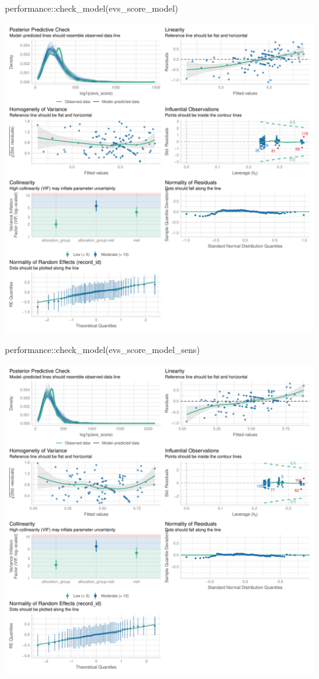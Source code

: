 \documentclass[
  12pt,
]{article}
\newenvironment{Shaded}{\begin{snugshade}}{\end{snugshade}}
\newcommand{\FunctionTok}[1]{\textcolor[rgb]{0.28,0.35,0.67}{#1}}
\newcommand{\NormalTok}[1]{\textcolor[rgb]{0.00,0.23,0.31}{#1}}
\newcommand{\SpecialCharTok}[1]{\textcolor[rgb]{0.37,0.37,0.37}{#1}}
\begin{document}
\begin{Shaded}
\begin{Highlighting}[]
\NormalTok{performance}\SpecialCharTok{::}\FunctionTok{check\_model}\NormalTok{(evs\_score\_model)}
\end{Highlighting}
\end{Shaded}

\includegraphics{Outcomes_files/figure-pdf/evs_score_4-1.pdf}

\begin{Shaded}
\begin{Highlighting}[]
\NormalTok{performance}\SpecialCharTok{::}\FunctionTok{check\_model}\NormalTok{(evs\_score\_model\_sens)}
\end{Highlighting}
\end{Shaded}

\includegraphics{Outcomes_files/figure-pdf/evs_score_4-2.pdf}
\end{document}
